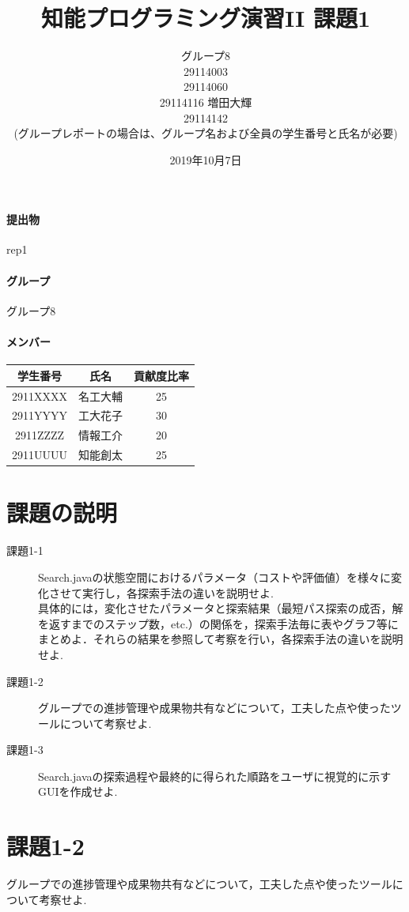 \documentclass[uplatex,12pt]{jsarticle}
\title{知能プログラミング演習II 課題1}
\author{グループ8\\
  29114003 \\
  29114060 \\
  29114116 増田大輝\\
  29114142 \\
  {\small (グループレポートの場合は、グループ名および全員の学生番号と氏名が必要)}
}
\date{2019年10月7日}
\begin{document}
\maketitle

\paragraph{提出物} rep1
\paragraph{グループ} グループ8

\paragraph{メンバー}
\begin{tabular}{|c|c|c|}
  \hline
  学生番号&氏名&貢献度比率\\
  \hline\hline
  2911XXXX&名工大輔&25\\
  \hline
  2911YYYY&工大花子&30\\
  \hline
  2911ZZZZ&情報工介&20\\
  \hline
  2911UUUU&知能創太&25\\
  \hline
\end{tabular}



\section{課題の説明}
\begin{description}
\item[課題1-1] Search.javaの状態空間におけるパラメータ（コストや評価値）を様々に変化させて実行し，各探索手法の違いを説明せよ. \\
具体的には，変化させたパラメータと探索結果（最短パス探索の成否，解を返すまでのステップ数，etc.）の関係を，探索手法毎に表やグラフ等にまとめよ．それらの結果を参照して考察を行い，各探索手法の違いを説明せよ. \\
\item[課題1-2] グループでの進捗管理や成果物共有などについて，工夫した点や使ったツールについて考察せよ.
\item[課題1-3] Search.javaの探索過程や最終的に得られた順路をユーザに視覚的に示すGUIを作成せよ. 
\end{description}

\section{課題1-2}
\begin{screen}
  グループでの進捗管理や成果物共有などについて，工夫した点や使ったツールについて考察せよ.
\end{screen}
\end{document}

